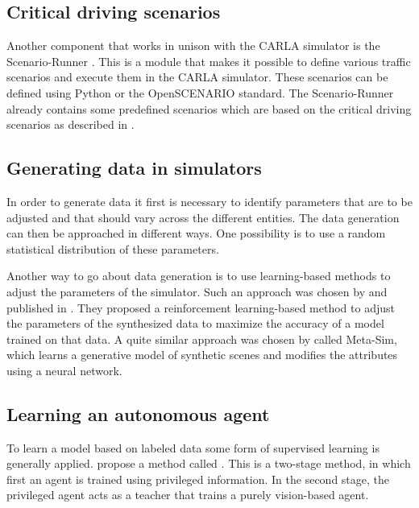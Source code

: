 \documentclass[conference, a4paper, 11pt]{IEEEtran}
\begin{document}
	\subsection{Critical driving scenarios}
	
	Another component that works in unison with the CARLA simulator is the Scenario-Runner \cite{CARLA:ScenarioRunner}.
	This is a module that makes it possible to define various traffic scenarios and execute them in the CARLA simulator.
	These scenarios can be defined using Python or the OpenSCENARIO \cite{OpenScenario} standard.
	The Scenario-Runner already contains some predefined scenarios which are based on the critical driving scenarios as described in  \cite{NHTSA:PreCrashScenarios}.
	
	\subsection{Generating data in simulators}
	
	In order to generate data it first is necessary to identify parameters that are to be adjusted and that should vary across the different entities.
	The data generation can then be approached in different ways.
	One possibility is to use a random statistical distribution of these parameters. 
	
	Another way to go about data generation is to use learning-based methods to adjust the parameters of the simulator.
	Such an approach was chosen by \citeauthor{DBLP:LearningToSimulate} and published in  \cite{DBLP:LearningToSimulate}.
	They proposed a reinforcement learning-based method to adjust the parameters of the synthesized data to maximize the accuracy of a model trained on that data.
	A quite similar approach was chosen by \citeauthor{DBLP:Meta-Sim} \cite{DBLP:Meta-Sim} called Meta-Sim, which learns a generative model of synthetic scenes and modifies the attributes using a neural network.
	
	\subsection{Learning an autonomous agent}
	
	To learn a model based on labeled data some form of supervised learning is generally applied.
	\citeauthor{Chen:LearningByCheating} propose a method called  \cite{Chen:LearningByCheating}.
	This is a two-stage method, in which first an agent is trained using privileged information.
	In the second stage, the privileged agent acts as a teacher that trains a purely vision-based agent.
	
\end{document}
